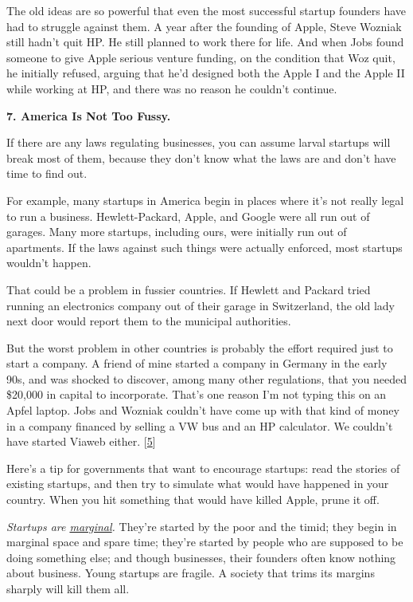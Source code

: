 The old ideas are so powerful that even the most successful startup
founders have had to struggle against them. A year after the founding of
Apple, Steve Wozniak still hadn't quit HP. He still planned to work
there for life. And when Jobs found someone to give Apple serious
venture funding, on the condition that Woz quit, he initially refused,
arguing that he'd designed both the Apple I and the Apple II while
working at HP, and there was no reason he couldn't continue.

\textbf{7. America Is Not Too Fussy.}

If there are any laws regulating businesses, you can assume larval
startups will break most of them, because they don't know what the laws
are and don't have time to find out.

For example, many startups in America begin in places where it's not
really legal to run a business. Hewlett-Packard, Apple, and Google were
all run out of garages. Many more startups, including ours, were
initially run out of apartments. If the laws against such things were
actually enforced, most startups wouldn't happen.

That could be a problem in fussier countries. If Hewlett and Packard
tried running an electronics company out of their garage in Switzerland,
the old lady next door would report them to the municipal authorities.

But the worst problem in other countries is probably the effort required
just to start a company. A friend of mine started a company in Germany
in the early 90s, and was shocked to discover, among many other
regulations, that you needed \$20,000 in capital to incorporate. That's
one reason I'm not typing this on an Apfel laptop. Jobs and Wozniak
couldn't have come up with that kind of money in a company financed by
selling a VW bus and an HP calculator. We couldn't have started Viaweb
either. {[}\hyperref[f5n]{5}{]}

Here's a tip for governments that want to encourage startups: read the
stories of existing startups, and then try to simulate what would have
happened in your country. When you hit something that would have killed
Apple, prune it off.

\emph{Startups are \href{marginal.html}{marginal}.} They're started by
the poor and the timid; they begin in marginal space and spare time;
they're started by people who are supposed to be doing something else;
and though businesses, their founders often know nothing about business.
Young startups are fragile. A society that trims its margins sharply
will kill them all.

